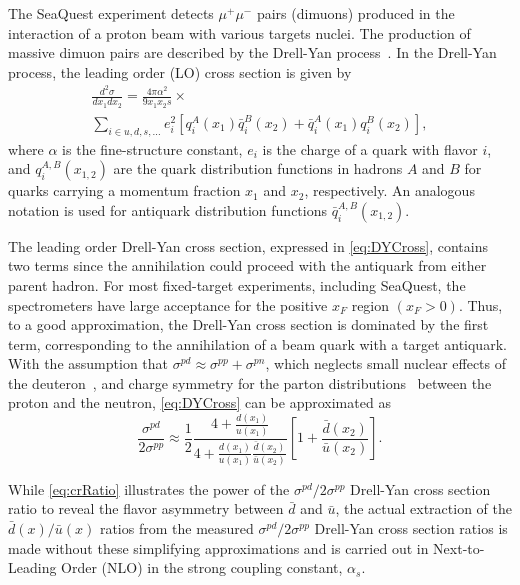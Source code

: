 \documentclass[reprint,aps,unsortedaddress,superscriptaddress,prl,floatfix,showpacs,linenumbers,final]{revtex4-2}
\begin{document}
The SeaQuest experiment detects $\mu^+\mu^-$ pairs (dimuons) produced in the interaction of a proton
beam with various targets nuclei. The production of massive dimuon pairs are described by the Drell-Yan
process~\cite{drell1970}. In the Drell-Yan process, the leading order (LO) cross section is given by
\begin{multline}
	\frac{d^2\sigma}{dx_1dx_2}=\frac{4\pi \alpha^2}{9x_1x_2s} \times
	\label{eq:DYCross} \\
	\sum_{i\in u,d,s,\dots} e_i^2 \left[q_i^A\left(x_1\right) \bar q_i^B\left(x_2\right) + \bar q_i^A\left(x_1\right)
		q_i^B\left(x_2\right)\right],
\end{multline}
where $\alpha$ is the fine-structure constant, $e_i$ is the charge of a quark with flavor $i$,
and $q_i^{A,B}\left(x_{1,2}\right)$ are the quark distribution functions in hadrons $A$ and $B$
for quarks carrying a momentum fraction $x_1$ and $x_2$, respectively.
An analogous notation is used for antiquark distribution functions $\bar q_i^{A,B}\left(x_{1,2}\right)$.

The leading order Drell-Yan cross section, expressed in \cref{eq:DYCross},
contains two terms since the annihilation could proceed with the antiquark from either parent hadron.
For most fixed-target experiments, including SeaQuest,
the spectrometers have large acceptance for the positive $x_F$  region $\left(x_F > 0\right)$.
Thus, to a good approximation, the Drell-Yan cross section is dominated by the first term,
corresponding to the annihilation of a beam quark with a target antiquark.
With the assumption that $\sigma^{pd} \approx \sigma^{pp} + \sigma^{pn}$,
which neglects small nuclear effects of the deuteron~\cite{kumano1998,ehlers2014},
and charge symmetry for the parton distributions~\cite{londergan2010} between the proton and the neutron,
\cref{eq:DYCross} can be approximated as
\begin{equation}
	\frac{\sigma^{pd}}{2\sigma^{pp}} \approx
	\frac{1}{2} \frac{4+\frac{d\left(x_1\right)}{u\left(x_1\right)}}{4+\frac{d\left(x_1\right)}{u\left(x_1\right)}\frac{\bar d\left(x_2\right)}{\bar u\left(x_2\right)}}
	\left[1+\frac{\bar d\left(x_2\right)}{\bar u\left(x_2\right)}\right].
	\label{eq:crRatio}
\end{equation}

While \cref{eq:crRatio} illustrates the power of the $\sigma^{pd}/2\sigma^{pp}$ Drell-Yan cross section
ratio to reveal the flavor asymmetry between $\bar d$ and $\bar u$,
the actual extraction of the $\bar d\left(x\right) / \bar u\left(x\right)$ ratios
from the measured $\sigma^{pd}/ 2 \sigma^{pp}$ Drell-Yan cross section ratios is
made without these simplifying approximations and is carried out in Next-to-Leading Order (NLO)
in the strong coupling constant, $\alpha_s$.
\end{document}
